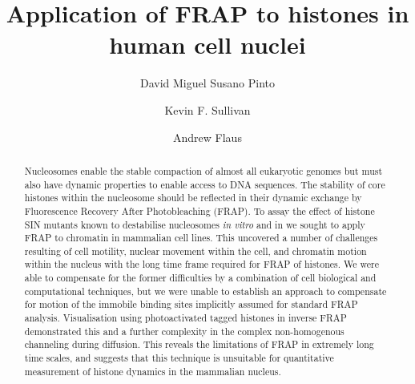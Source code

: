 \documentclass[a4paper,oneside,onecolumn,article,draft]{memoir}
\author{David Miguel Susano Pinto \and Kevin F. Sullivan \and Andrew Flaus}
\title{Application of FRAP to histones in human cell nuclei}
\begin{document}
  \maketitle

  \begin{abstract}
    Nucleosomes enable the stable compaction of almost all eukaryotic
    genomes but must also have dynamic properties to enable access to
    DNA sequences.  The stability of core histones within the
    nucleosome should be reflected in their dynamic exchange by
    Fluorescence Recovery After Photobleaching (FRAP).  To assay the
    effect of histone SIN mutants known to destabilise nucleosomes
    \textit{in vitro} and in  we sought to
    apply FRAP to chromatin in mammalian cell lines.  This uncovered a
    number of challenges resulting of cell motility, nuclear movement
    within the cell, and chromatin motion within the nucleus with the
    long time frame required for FRAP of histones.  We were able to
    compensate for the former difficulties by a combination of cell
    biological and computational techniques, but we were unable to
    establish an approach to compensate for motion of the immobile
    binding sites implicitly assumed for standard FRAP analysis.
    Visualisation using photoactivated tagged histones in inverse FRAP
    demonstrated this and a further complexity in the complex
    non-homogenous channeling during diffusion.  This reveals the
    limitations of FRAP in extremely long time scales, and suggests
    that this technique is unsuitable for quantitative measurement of
    histone dynamics in the mammalian nucleus.
  \end{abstract}

  
  
  
  
  
\end{document}

